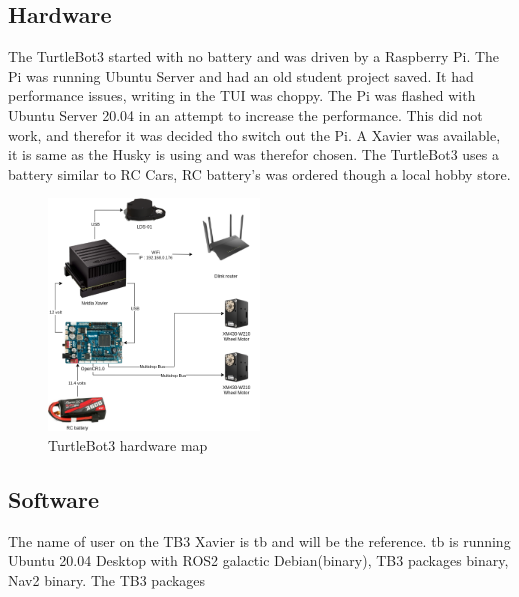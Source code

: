 \subsection{Hardware}
The TurtleBot3 started with no battery and was driven by a Raspberry Pi. The Pi was running Ubuntu Server and had an old student project saved. It had performance issues, writing in the TUI was choppy. The Pi was flashed with Ubuntu Server 20.04 in an attempt to increase the performance. This did not work, and therefor it was decided tho switch out the Pi. A Xavier was available, it is same as the Husky is using and was therefor chosen. The TurtleBot3 uses a battery similar to RC Cars, RC battery's was ordered though a local hobby store. 

\begin{figure}[H]
    \centering
    \includegraphics[width = 0.5\textwidth]{Figures/drawio/TB_HW.drawio.png}
    \caption{TurtleBot3 hardware map}
    \label{fig:TB3Hardware}
\end{figure}

\subsection{Software}
The name of user on the TB3 Xavier is tb and will be the reference. tb is running Ubuntu 20.04 Desktop with ROS2 galactic Debian(binary), TB3 packages binary, Nav2 binary. The TB3 packages 